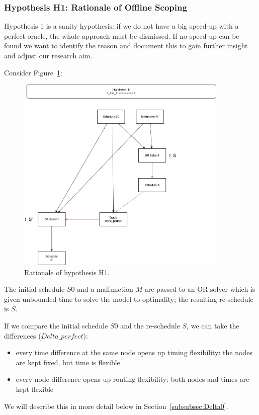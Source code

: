 \documentclass{article}
\begin{document}
\subsubsection{Hypothesis H1: Rationale of Offline Scoping}\label{subec:H1}

Hypothesis 1 is a sanity hypothesis: if we do not have a big speed-up with a perfect oracle, the whole approach must be dismissed. If no speed-up can be found we want to identify the reason and document this to gain further insight and adjust our research aim.

Consider Figure~\ref{fig:introduction_H1}:
%
\begin{figure}[hbtp]
	\centering
  \includegraphics[width=0.9\textwidth]{introduction_H1.png}
	\caption{Rationale of hypothesis H1.}
	\label{fig:introduction_H1}
\end{figure}
%
The initial schedule $S0$ and a malfunction $M$ are passed to an OR solver which is given unbounded time to solve the model to optimality; the resulting re-schedule is $S$.

If we compare the initial schedule $S0$ and the re-schedule $S$, we can take the differences ($Delta\_perfect$):

\begin{itemize}
    \item     every time difference at the same node opens up timing flexibility: the nodes are kept fixed, but time is flexible
    \item every node difference opens up routing flexibility: both nodes and times are kept flexible
\end{itemize}
We will describe this in more detail below in Section~\ref{subsubsec:Delta0}.
\end{document}

